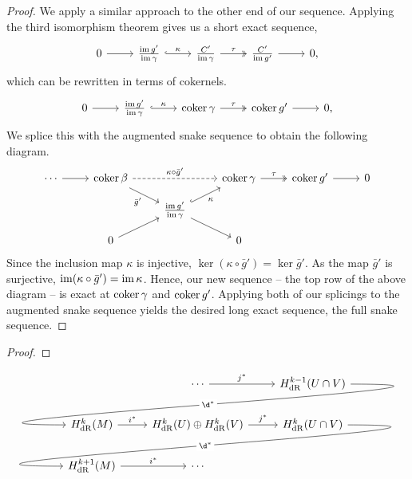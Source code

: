 \documentclass[a4paper,12pt]{article}
\begin{document}
\begin{proof}
    We apply a similar approach to the other end of our sequence.
    Applying the third isomorphism theorem gives us a short exact sequence,
    \[\begin{tikzcd}
	0 & {\frac{\im g'}{\im \gamma}} & {\frac{C'}{\im \gamma}} & {\frac{C'}{\im g'}} & 0,
	\arrow[from=1-1, to=1-2]
	\arrow["\kappa", hook, from=1-2, to=1-3]
	\arrow["\tau", two heads, from=1-3, to=1-4]
	\arrow[from=1-4, to=1-5]
    \end{tikzcd}\]
    which can be rewritten in terms of cokernels.
    \[\begin{tikzcd}
	0 & {\frac{\im g'}{\im \gamma}} & {\coker \gamma} & {\coker g'} & 0,
	\arrow[from=1-1, to=1-2]
	\arrow["\kappa", hook, from=1-2, to=1-3]
	\arrow["\tau", two heads, from=1-3, to=1-4]
	\arrow[from=1-4, to=1-5]
    \end{tikzcd}\]
    We splice this with the augmented snake sequence to obtain the following diagram.
    \[\begin{tikzcd}[row sep=small]
	\cdots & {\coker \beta} && {\coker \gamma} & {\coker g'} & 0 \\
	&& {\frac{\im g'}{\im \gamma}} \\
	& 0 && 0
	\arrow[from=1-1, to=1-2]
	\arrow["{\kappa \circ \bar{g}'}", dashed, from=1-2, to=1-4]
	\arrow["{\bar{g}'}"', from=1-2, to=2-3]
	\arrow["\tau", two heads, from=1-4, to=1-5]
	\arrow[from=1-5, to=1-6]
	\arrow["\kappa"', hook, from=2-3, to=1-4]
	\arrow[from=2-3, to=3-4]
	\arrow[from=3-2, to=2-3]
    \end{tikzcd}\]
    Since the inclusion map $\kappa$ is injective, $\ker (\kappa \circ \bar{g}') = \ker \bar{g}'$.
    As the map $\bar{g}'$ is surjective, $\operatorname{im} (\kappa \circ \bar{g}') = \operatorname{im} \kappa$.
    Hence, our new sequence -- the top row of the above diagram -- is exact at $\operatorname{coker} \gamma$ and $\operatorname{coker} g'$.
    Applying both of our splicings to the augmented snake sequence yields the desired long exact sequence, the full snake sequence.
\end{proof}


\begin{theorem}\label{thm:mayer--vietoris_sequence}
    
\end{theorem}
\begin{proof}
    
\end{proof}
\[
\begin{tikzcd}
    & \cdots \ar[r, "j^*"] & H_{\mathrm{dR}}^{k-1}(U \cap V) \ar[out=0, in=180, looseness=2, overlay, lld, "\d^*"{description}]\\
    H^k_{\mathrm{dR}}(M) \ar[r, "i^*"] & H^k_{\mathrm{dR}}(U) \oplus H^k_{\mathrm{dR}}(V) \ar[r, "j^*"] & H^k_{\mathrm{dR}}(U \cap V) \ar[out=0, in=180, looseness=2, overlay, lld, "\d^*"{description}]\\
    H_{\mathrm{dR}}^{k+1}(M) \ar[r, "i^*"] & \cdots &
\end{tikzcd}
\]
\end{document}
